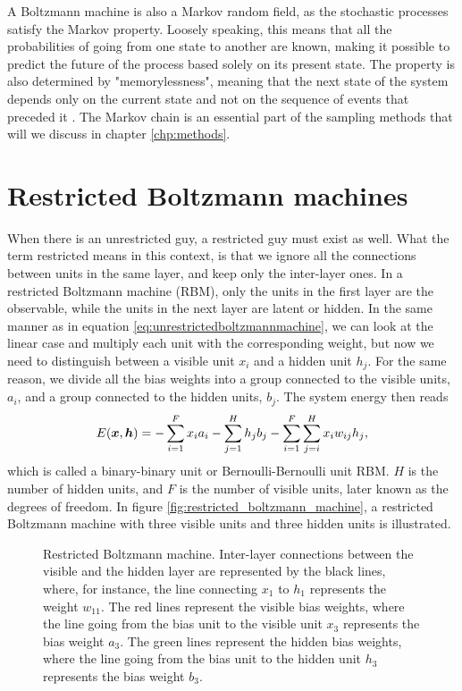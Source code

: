 A Boltzmann machine is also a Markov random field, as the stochastic processes satisfy the Markov property. Loosely speaking, this means that all the probabilities of going from one state to another are known, making it possible to predict the future of the process based solely on its present state. The property is also determined by "memorylessness", meaning that the next state of the system depends only on the current state and not on the sequence of events that preceded it \cite{fischer_training_2014}. The Markov chain is an essential part of the sampling methods that will we discuss in chapter \ref{chp:methods}.

\section{Restricted Boltzmann machines} \label{sec:RBM}
When there is an unrestricted guy, a restricted guy must exist as well. What the term restricted means in this context, is that we ignore all the connections between units in the same layer, and keep only the inter-layer ones. In a restricted Boltzmann machine (RBM), only the units in the first layer are the observable, while the units in the next layer are latent or hidden. In the same manner as in equation \eqref{eq:unrestrictedboltzmannmachine}, we can look at the linear case and multiply each unit with the corresponding weight, but now we need to distinguish between a visible unit $x_i$ and a hidden unit $h_j$. For the same reason, we divide all the bias weights into a group connected to the visible units, $a_i$, and a group connected to the hidden units, $b_j$. The system energy then reads
\begin{equation}
E(\boldsymbol{{x}},\boldsymbol{{h}})=- \sum_{i=1}^Fx_ia_i- \sum_{j=1}^Hh_jb_j-\sum_{i=1}^F\sum_{j=i}^H x_iw_{ij}h_j,
\label{eq:binarybinary}
\end{equation}
which is called a binary-binary unit or Bernoulli-Bernoulli unit RBM. $H$ is the number of hidden units, and $F$ is the number of visible units, later known as the degrees of freedom. In figure \eqref{fig:restricted_boltzmann_machine}, a restricted Boltzmann machine with three visible units and three hidden units is illustrated.

\begin{figure}
	\centering
	
	\caption{Restricted Boltzmann machine. Inter-layer connections between the visible and the hidden layer are represented by the black lines, where, for instance, the line connecting $x_1$ to $h_1$ represents the weight $w_{11}$. The \textcolor{color1}{red} lines represent the visible bias weights, where the line going from the bias unit to the visible unit $x_3$ represents the bias weight $a_3$. The \textcolor{color3}{green} lines represent the hidden bias weights, where the line going from the bias unit to the hidden unit $h_3$ represents the bias weight $b_3$.}
	\label{fig:restricted_boltzmann_machine}
\end{figure}

